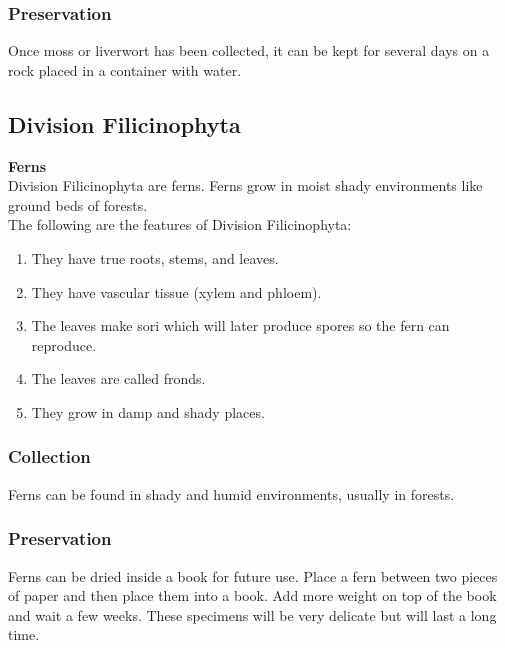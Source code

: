 \subsubsection*{Preservation} 
Once moss or liverwort has been collected, it can be kept for several days on a rock placed in a container with water.

\subsection{Division Filicinophyta}

\textbf{Ferns}\\
 Division Filicinophyta are ferns. Ferns grow in moist shady environments like ground beds of forests. 
\\
The following are the features of Division Filicinophyta:
\begin{enumerate}
\item{They have true roots, stems, and leaves.}
\item{They have vascular tissue (xylem and phloem).}
\item{The leaves make sori which will later produce spores so the fern can reproduce.}
\item{The leaves are called fronds.}
\item{They grow in damp and shady places.}
\end{enumerate}

\subsubsection{Collection}
Ferns can be found in shady and humid environments, usually in forests. 

\subsubsection*{Preservation} 
Ferns can be dried inside a book for future use. Place a fern between two pieces of paper and then place them into a book. Add more weight on top of the book and wait a few weeks. These specimens will be very delicate but will last a long time.

